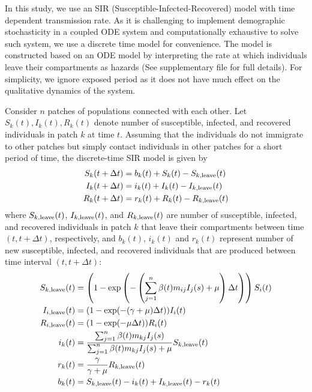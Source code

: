 \documentclass[12pt]{article}
\begin{document}
In this study, we use an SIR (Susceptible-Infected-Recovered) model with time dependent transmission rate.
As it is challenging to implement demographic stochasticity in a coupled ODE system and computationally exhaustive to solve such system, we use a discrete time model for convenience.
The model is constructed based on an ODE model by interpreting the rate at which individuals leave their compartments as hazards (See supplementary file for full details).
For simplicity, we ignore exposed period as it does not have much effect on the qualitative dynamics of the system.

Consider $n$ patches of populations connected with each other.
Let $S_k(t), I_k(t), R_k(t)$ denote number of susceptible, infected, and recovered individuals in patch $k$ at time $t$.
Assuming that the individuals do not immigrate to other patches but simply contact individuals in other patches for a short period of time, the discrete-time SIR model is given by
\begin{equation}
\label{eq:discretedeterministic}
\begin{aligned}
S_{k}(t+\Delta t) &= b_k(t) + S_k(t) - S_{k, \tiny{\textrm{leave}}}(t)\\
I_{k}(t+\Delta t) &= i_k(t) + I_k(t) - I_{k, \tiny{\textrm{leave}}}(t)\\
R_{k}(t+\Delta t) &= r_k(t) + R_k(t) - R_{k, \tiny{\textrm{leave}}}(t)
\end{aligned}
\end{equation}
where $S_{k, \tiny{\textrm{leave}}}(t)$, $I_{k, \tiny{\textrm{leave}}}(t)$, and $R_{k, \tiny{\textrm{leave}}}(t)$ are number of susceptible, infected, and recovered individuals in patch $k$ that leave their compartments between time $(t, t + \Delta t)$, respectively, and $b_k(t)$, $i_k(t)$ and $r_k(t)$ represent number of new susceptible, infected, and recovered individuals that are produced between time interval $(t, t+\Delta t)$:
\begin{equation}
\begin{aligned}
S_{k, \tiny{\textrm{leave}}}(t) &= \left(1 - \exp \left(-\left(\sum_{j=1}^n \beta(t) m_{ij} I_j(s) + \mu \right) \Delta t \right) \right) S_i(t)\\
I_{i, \tiny{\textrm{leave}}}(t) &= (1 - \exp(-(\gamma + \mu)\Delta t)) I_i(t) \\
R_{i, \tiny{\textrm{leave}}}(t) &= (1 - \exp(-\mu \Delta t)) R_i(t) \\
i_k(t) &= \frac{\sum_{j=1}^n \beta(t) m_{kj} I_j(s)}{\sum_{j=1}^n \beta(t) m_{kj} I_j(s) + \mu} S_{k, \tiny{\textrm{leave}}}(t)\\
r_k(t) &= \frac{\gamma}{\gamma + \mu} R_{k, \tiny{\textrm{leave}}}(t)\\
b_k(t) &= S_{k, \tiny{\textrm{leave}}}(t) - i_k(t) + I_{k, \tiny{\textrm{leave}}}(t) - r_k(t)\\
\end{aligned}
\end{equation}
\end{document}
